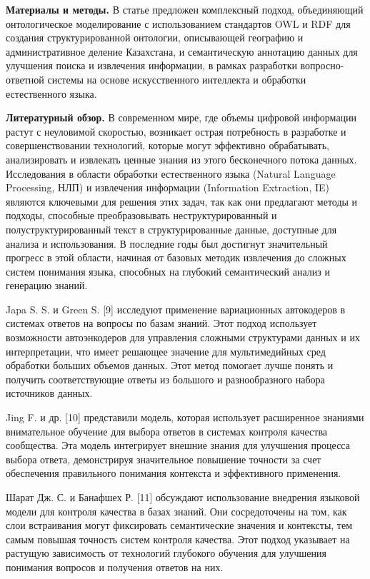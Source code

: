 \textbf{Материалы и методы.} В статье предложен комплексный подход,
объединяющий онтологическое моделирование с использованием стандартов
OWL и RDF для создания структурированной онтологии, описывающей
географию и административное деление Казахстана, и семантическую
аннотацию данных для улучшения поиска и извлечения информации, в рамках
разработки вопросно-ответной системы на основе искусственного интеллекта
и обработки естественного языка.

\textbf{Литературный обзор.} В современном мире, где объемы цифровой
информации растут с неуловимой скоростью, возникает острая потребность в
разработке и совершенствовании технологий, которые могут эффективно
обрабатывать, анализировать и извлекать ценные знания из этого
бесконечного потока данных. Исследования в области обработки
естественного языка (Natural Language Processing, НЛП) и извлечения
информации (Information Extraction, IE) являются ключевыми для решения
этих задач, так как они предлагают методы и подходы, способные
преобразовывать неструктурированный и полуструктурированный текст в
структурированные данные, доступные для анализа и использования. В
последние годы был достигнут значительный прогресс в этой области,
начиная от базовых методик извлечения до сложных систем понимания языка,
способных на глубокий семантический анализ и генерацию знаний.

Japa S. S. и Green S. {[}9{]} исследуют применение вариационных
автокодеров в системах ответов на вопросы по базам знаний. Этот подход
использует возможности автоэнкодеров для управления сложными структурами
данных и их интерпретации, что имеет решающее значение для
мультимедийных сред обработки больших объемов данных. Этот метод
помогает лучше понять и получить соответствующие ответы из большого и
разнообразного набора источников данных.

Jing F. и др. {[}10{]} представили модель, которая использует
расширенное знаниями внимательное обучение для выбора ответов в системах
контроля качества сообщества. Эта модель интегрирует внешние знания для
улучшения процесса выбора ответа, демонстрируя значительное повышение
точности за счет обеспечения правильного понимания контекста и
эффективного применения.

Шарат Дж. С. и Банафшех Р. {[}11{]} обсуждают использование внедрения
языковой модели для контроля качества в базах знаний. Они сосредоточены
на том, как слои встраивания могут фиксировать семантические значения и
контексты, тем самым повышая точность систем контроля качества. Этот
подход указывает на растущую зависимость от технологий глубокого
обучения для улучшения понимания вопросов и получения ответов на них.

